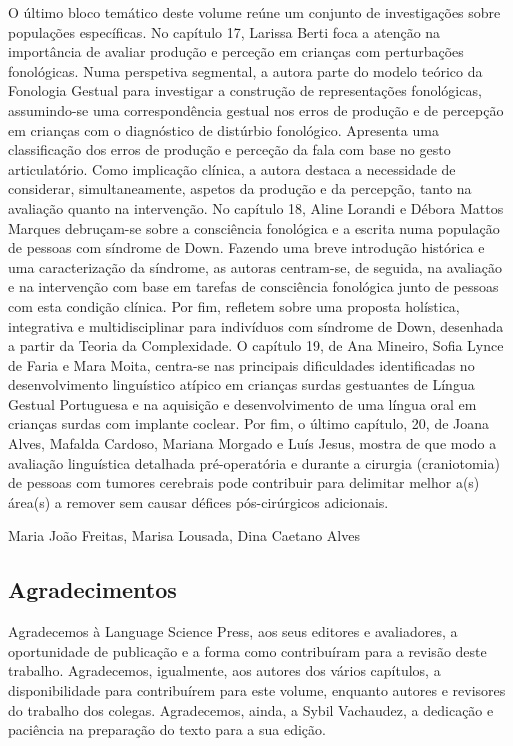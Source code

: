 \begin{refsection}
O último bloco temático deste volume reúne um conjunto de investigações sobre populações específicas. No capítulo 17, Larissa Berti foca a atenção na importância de avaliar produção e perceção em crianças com perturbações fonológicas. Numa perspetiva segmental, a autora parte do modelo teórico da Fonologia Gestual para investigar a construção de representações fonoló\-gicas, assumindo-se uma correspondência gestual nos erros de produção e de percepção em crianças com o diagnóstico de distúrbio fonológico. Apresenta uma classificação dos erros de produção e perceção da fala com base no gesto articulatório. Como implicação clínica, a autora destaca a necessidade de considerar, simultaneamente, aspetos da produção e da percepção, tanto na avaliação quanto na intervenção. No capítulo 18, Aline Lorandi e Débora Mattos Marques debruçam-se sobre a consciência fonológica e a escrita numa população de pessoas com síndrome de Down. Fazendo uma breve introdução histórica e uma caracterização da síndrome, as autoras centram-se, de seguida, na avaliação e na intervenção com base em tarefas de consciência fonológica junto de pessoas com esta condição clínica. Por fim, refletem sobre uma proposta holística, integrativa e multidisciplinar para indivíduos com síndrome de Down, desenhada a partir da Teoria da Complexidade. O capítulo 19, de Ana Mineiro, Sofia Lynce de Faria e Mara Moita, centra-se nas principais dificuldades identificadas no desenvolvimento linguístico atípico em crianças surdas gestuantes de Língua Gestual Portuguesa e na aquisição e desenvolvimento de uma língua oral em crianças surdas com implante coclear. Por fim, o último capítulo, 20, de Joana Alves, Mafalda Cardoso, Mariana Morgado e Luís Jesus, mostra de que modo a avaliação linguística deta\-lhada pré-operatória e durante a cirurgia (craniotomia) de pessoas com tumores cerebrais pode contribuir para delimitar melhor a(s) área(s) a remover sem causar défices pós-cirúrgicos adicionais.


Maria João Freitas, Marisa Lousada, Dina Caetano Alves

\subsection*{Agradecimentos}Agradecemos à Language Science Press, aos seus editores e avaliadores, a oportunidade de publicação e a forma como contribuíram para a revisão deste trabalho. Agradecemos, igualmente, aos autores dos vários capítulos, a disponibilidade para contribuírem para este volume, enquanto autores e revisores do trabalho dos colegas. Agradecemos, ainda, a Sybil Vachaudez, a dedicação e paciência na preparação do texto para a sua edição.


\end{refsection}
